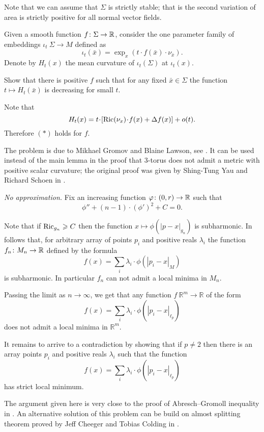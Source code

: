 Note that we can assume that $\Sigma$ is strictly stable;
that is the second variation of area is strictly positive for all normal vector fields.

Given a smooth function $f\colon\Sigma\to\mathbb{R}$,
consider the one parameter family of embeddings
$\iota_t\:\Sigma\to M$ 
defined as 
\[\iota_t(\bar x)=\exp_x(t\cdot f(\bar x)\cdot \nu_{\bar x}).\]
Denote by $H_t(x)$
the mean curvature 
of $\iota_t(\Sigma)$ 
at $\iota_t(x)$.

Show that there is positive $f$ such that for any fixed $\bar x\in\Sigma$ the function $t\mapsto H_t(\bar x)$ is decreasing for small $t$.

Note that 
\[H_t(x)=t\cdot[\Ric(\nu_x)\cdot f(x)+\Delta f(x)]+o(t).\]
Therefore $({*})$ holds for $f$.

The problem is due to Mikhael Gromov and Blaine Lawson, see \cite{gromov-lawson}.
It can be used instead of the main lemma 
in the proof that 3-torus does not admit a metric with positive scalar curvature;
the original proof was given by Shing-Tung  Yau and Richard Schoen in \cite{schoen-yau}.





\textit{No approximation.}
Fix an increasing function $\varphi\colon(0,r)\to \mathbb{R}$
such that 
\[\phi''+(n-1)\cdot(\phi')^2+C=0.\]

Note that if $\operatorname{\rm Ric}_{g_n}\geqslant C$ then the function 
$x\mapsto\phi(|p-x|_{g_n})$ is subharmonic.
In follows that, 
for arbitrary array of points $p_i$ 
and positive reals $\lambda_i$ the function $f_n\colon M_n\to \mathbb{R}$
defined by the formula
$$f(x)=\sum_i\lambda_i\cdot\phi(|p_i-x|_M)$$
is subharmonic.
In particular $f_n$ can not admit a local minima in $M_n$.

Passing the limit as $n\to \infty$, we get that any function $f\:\mathbb{R}^m\to\mathbb{R}$
of the form 
$$f(x)=\sum_i\lambda_i\cdot\phi(|p_i-x|_{\ell_p})$$
does not admit a local minima in $\mathbb{R}^m$.

It remains to arrive to a contradiction
by showing that if $p\ne 2$ then there is an array
points $p_i$ and positive reals $\lambda_i$
such that the function 
$$f(x)=\sum_i\lambda_i\cdot\phi(|p_i-x|_{\ell_p})$$
has strict local minimum.

 The argument given here is very close to the proof of Abresch--Gromoll inequality in \cite{abresch-gromoll}.
An alternative solution of this problem can be build on almost splitting theorem proved by  Jeff Cheeger and Tobias Colding in \cite{cheeger-colding}.


